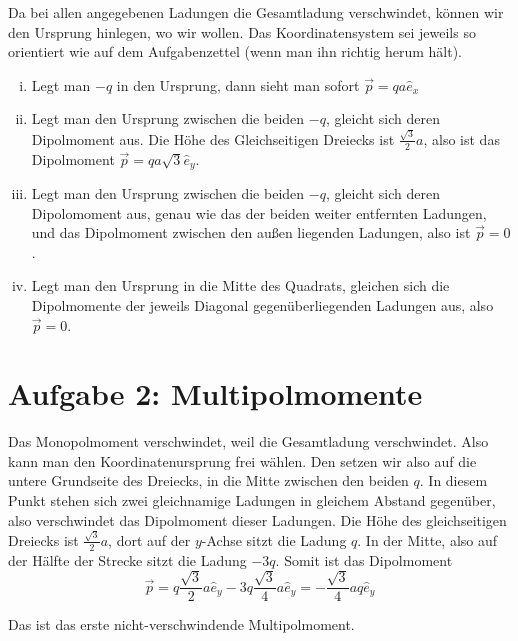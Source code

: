 \documentclass[a4paper,german,12pt,smallheadings]{scrartcl}
\begin{document}
\begin{enumerate}[a)]
    Da bei allen angegebenen Ladungen die Gesamtladung verschwindet, können wir
    den Ursprung hinlegen, wo wir wollen. Das Koordinatensystem sei jeweils so
    orientiert wie auf dem Aufgabenzettel (wenn man ihn richtig herum hält).
    \begin{enumerate}[(i)]
      \item
        Legt man $-q$ in den Ursprung, dann sieht man sofort $\vec{p} = q a \hat{e}_x$
      \item
        Legt man den Ursprung zwischen die beiden $-q$, gleicht sich deren
        Dipolmoment aus. Die Höhe des Gleichseitigen Dreiecks ist
        $\frac{\sqrt{3}}{2} a$, also ist das Dipolmoment $\vec{p} = q a \sqrt{3} \hat{e}_y$.
      \item
        Legt man den Ursprung zwischen die beiden $-q$, gleicht sich deren
        Dipolomoment aus, genau wie das der beiden weiter entfernten Ladungen,
        und das Dipolmoment zwischen den außen liegenden Ladungen, also ist
        $\vec{p} = 0$.
      \item
        Legt man den Ursprung in die Mitte des Quadrats, gleichen sich die
        Dipolmomente der jeweils Diagonal gegenüberliegenden Ladungen aus, also
        $\vec{p} = 0$.
    \end{enumerate}
\end{enumerate}
\section*{Aufgabe 2: Multipolmomente}
Das Monopolmoment verschwindet, weil die Gesamtladung verschwindet. Also kann
man den Koordinatenursprung frei wählen. Den setzen wir also auf die untere
Grundseite des Dreiecks, in die Mitte zwischen den beiden $q$. In diesem Punkt
stehen sich zwei gleichnamige Ladungen in gleichem Abstand gegenüber, also
verschwindet das Dipolmoment dieser Ladungen. Die Höhe des gleichseitigen
Dreiecks ist $\frac{\sqrt{3}}{2}a$, dort auf der $y$-Achse sitzt die Ladung $q$.
In der Mitte, also auf der Hälfte der Strecke sitzt die Ladung $-3q$. Somit ist
das Dipolmoment
\begin{equation}
  \vec{p} = q \frac{\sqrt{3}}{2} a \hat{e}_y - 3q \frac{\sqrt{3}}{4} a \hat{e}_y = -\frac{\sqrt{3}}{4} aq\hat{e}_y
\end{equation}

Das ist das erste nicht-verschwindende Multipolmoment.
\end{document}
